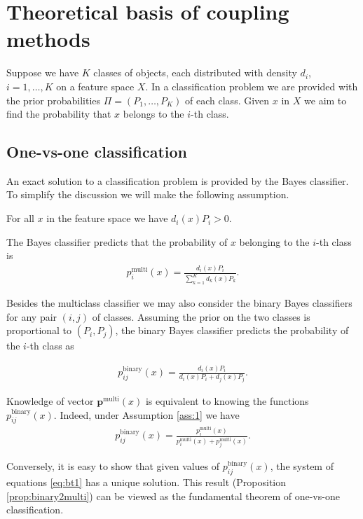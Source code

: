 \section{Theoretical basis of coupling methods} \label{sec:theory}

Suppose we have $K$ classes of objects, each distributed with density $d_i$, $i=1,\ldots, K$ on a feature 
space $X$. In a  classification problem we are provided with 
the prior probabilities $\Pi = (P_1, \ldots, P_K)$ of each class. Given $x$ in $X$ we aim to find 
the probability that $x$ belongs to the $i$-th class. 


\subsection{One-vs-one classification} \label{sec:one-vs-one}

An exact solution to a classification problem is provided by the Bayes classifier. To simplify the discussion we will make the following assumption.

\begin{assumption} \label{ass:1}
For all $x$ in the feature space we have $d_i(x) P_i > 0$.
\end{assumption}


The Bayes classifier predicts that the probability of $x$ belonging to the $i$-th class is
\begin{align}
 p^\textrm{multi}_i(x) = \frac{d_i(x) P_i}{\sum_{k=1}^K d_k(x)P_k}.
\end{align}

Besides the multiclass classifier we may also consider the binary Bayes classifiers for any pair $(i,j)$ of 
classes. Assuming the prior on the two classes is proportional to $(P_i, P_j)$, the binary Bayes classifier 
predicts the probability of the $i$-th class as 

\begin{align}
	p_{ij}^\textrm{binary}(x) = \frac{d_i(x) P_i}{d_i(x)P_i + d_j(x)P_j}.
\end{align}

Knowledge of vector $\boldsymbol{p}^\textrm{multi}(x)$ is equivalent to knowing the functions $p^\textrm{binary}_{ij}(x)$. Indeed, under Assumption \ref{ass:1} we have
\begin{align}
p_{ij}^\textrm{binary}(x) = \frac{p_i^\textrm{multi}(x)}{p_i^\textrm{multi}(x) + p_j^\textrm{multi}(x)}. \label{eq:bt1}
\end{align}

Conversely, it is easy to show that  given values of $p_{ij}^\textrm{binary}(x)$, the system of equations \eqref{eq:bt1} has a unique solution. This result (Proposition \ref{prop:binary2multi}) can be viewed as the fundamental theorem of one-vs-one classification.

